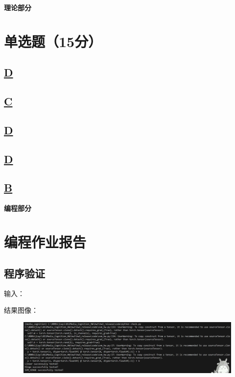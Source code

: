 \documentclass[a4paper]{article}
\begin{document}
\courseheader
\vspace{3mm}
\centerline{\textbf{\Large{理论部分}}}

\section{单选题（15分）}
\subsection{\underline{D}}

\subsection{\underline{C}}

\subsection{\underline{D}}

\subsection{\underline{D}}

\subsection{\underline{B}}
\clearpage




\vspace{3mm}
\centerline{\textbf{\Large{编程部分}}}
\vspace{3mm}
\section{编程作业报告}
\subsection{程序验证}
输入：

结果图像：
\begin{figure}[H]
    \centering
    \includegraphics[width=0.9\linewidth]{../../img/checkSVM-result.png}
    \caption{}
\end{figure}
\end{document}
